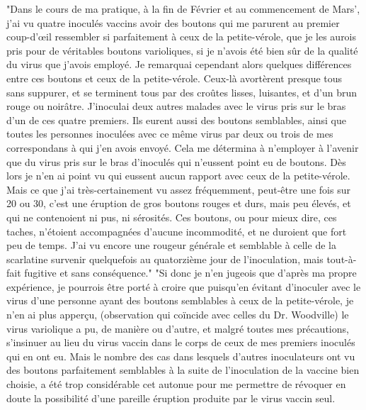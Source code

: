 "Dans le cours de ma pratique, à la fin de Février et au commencement de Mars', j'ai vu quatre inoculés vaccins avoir des boutons qui me parurent au premier coup-d'œil ressembler si parfaitement à ceux de la petite-vérole,\setcounter{page}{258} que je les aurois pris pour de véritables boutons varioliques, si je n'avois été bien sûr de la qualité du virus que j'avois employé. Je remarquai cependant alors quelques différences entre ces boutons et ceux de la petite-vérole. Ceux-là avortèrent presque tous sans suppurer, et se terminent tous par des croûtes lisses, luisantes, et d'un brun rouge ou noirâtre. J'inoculai deux autres malades avec le virus pris sur le bras d'un de ces quatre premiers. Ils eurent aussi des boutons semblables, ainsi que toutes les personnes inoculées avec ce même virus par deux ou trois de mes correspondans à qui j'en avois envoyé. Cela me détermina à n'employer à l'avenir que du virus pris sur le bras d'inoculés qui n'eussent point eu de boutons. Dès lors je n'en ai point vu qui eussent aucun rapport avec ceux de la petite-vérole. Mais ce que j'ai très-certainement vu assez fréquemment, peut-être une fois sur 20 ou 30, c'est une éruption de gros boutons rouges et durs, mais peu élevés, et qui ne contenoient ni pus, ni sérosités. Ces boutons, ou pour mieux dire, ces taches, n'étoient accompagnées d'aucune incommodité, et ne duroient que fort peu de temps. J'ai vu encore une rougeur générale et semblable à celle de la scarlatine survenir quelquefois au quatorzième\setcounter{page}{259} jour de l'inoculation, mais tout-à-fait fugitive et sans conséquence."
"Si donc je n'en jugeois que d'après ma propre expérience, je pourrois être porté à croire que puisqu'en évitant d'inoculer avec le virus d'une personne ayant des boutons semblables à ceux de la petite-vérole, je n'en ai plus apperçu, (observation qui coïncide avec celles du Dr. Woodville) le virus variolique a pu, de manière ou d'autre, et malgré toutes mes précautions, s'insinuer au lieu du virus vaccin dans le corps de ceux de mes premiers inoculés qui en ont eu. Mais le nombre des cas dans lesquels d'autres inoculateurs ont vu des boutons parfaitement semblables à la suite de l'inoculation de la vaccine bien choisie, a été trop considérable cet autonue pour me permettre de révoquer en doute la possibilité d'une pareille éruption produite par le virus vaccin seul.
